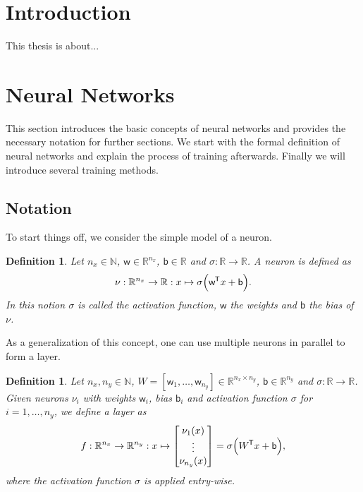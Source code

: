 \documentclass[11pt, a4paper]{article}
\newtheorem{definition}[theorem]{Definition}
\newcommand{\N}{\mathbb{N}}
\newcommand{\R}{\mathbb{R}}
\renewcommand{\b}{\mathsf{b}}
\newcommand{\w}{\mathsf{w}}
\newcommand*{\tr}{^{\mkern-1.5mu\mathsf{T}}}
\begin{document}
\tableofcontents
\thispagestyle{empty}

\pagebreak
\section{Introduction}

This thesis is about...

\pagebreak
\section{Neural Networks}

This section introduces the basic concepts of neural networks and provides the necessary notation for further sections. We start with the formal definition of neural networks and explain the process of training afterwards. Finally we will introduce several training methods.

\subsection{Notation} \label{sec:notation}

To start things off, we consider the simple model of a neuron. 

\begin{definition}
Let $n_x \in \N$, $\w \in \R^{n_x}$, $\b \in \R$ and $\sigma: \R \to \R$. A neuron is defined as
\[ \nu : \R^{n_x} \to \R : x \mapsto \sigma \Big ( \w \tr x + \b \Big ).\] %
In this notion $\sigma$ is called the activation function, $\w$ the weights and $\b$ the bias of $\nu$.
\end{definition}

As a generalization of this concept, one can use multiple neurons in parallel to form a layer.

\begin{definition}  \label{def:layer}
Let $n_x, n_y \in \N$, $W = [\w_1, \dots, \w_{n_y}] \in \R^{n_x \times n_y}$, $\b \in \R^{n_y}$ and $\sigma : \R \to \R$. Given neurons $\nu_i$ with weights $\w_i$, bias $\b_i$ and activation function $\sigma$ for $i=1, \dots, n_y$, we define a layer as
\[ f : \R^{n_x} \to \R^{n_y} : x \mapsto \begin{bmatrix} \nu_1(x) \\ \vdots \\ \nu_{n_y}(x) \end{bmatrix} = \sigma \Big ( W\tr x + \b \Big ), \]
where the activation function $\sigma$ is applied entry-wise.
\end{definition}
\end{document}
